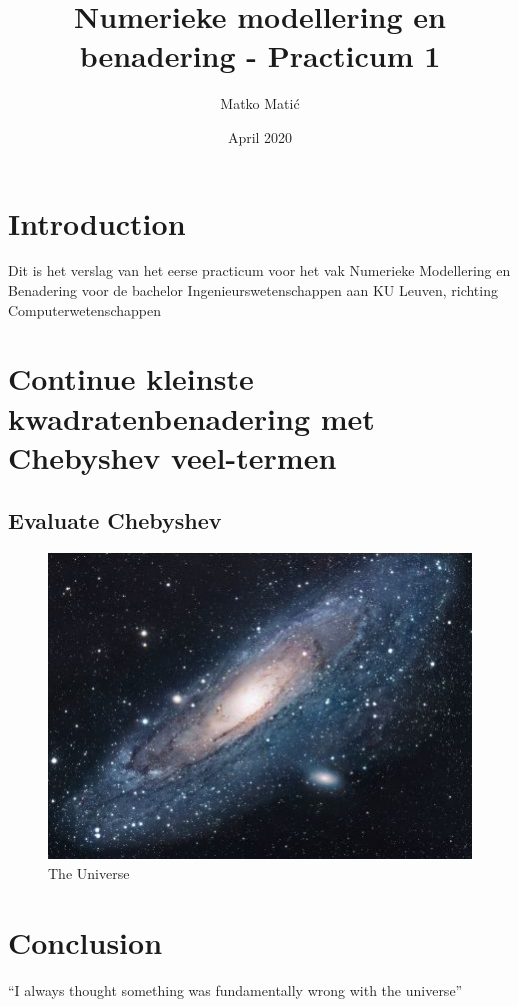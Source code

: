 \documentclass{article}
\title{Numerieke modellering en benadering - Practicum 1}
\author{Matko Matić }
\date{April 2020}
\begin{document}
\maketitle

\section{Introduction}
Dit is het verslag van het eerse practicum voor het vak Numerieke Modellering en Benadering voor de bachelor Ingenieurswetenschappen aan KU Leuven, richting Computerwetenschappen 


\section{Continue kleinste kwadratenbenadering met Chebyshev veel-termen}

\subsection{Evaluate Chebyshev}




\begin{figure}[h!]
\centering
\includegraphics[scale=1.7]{universe}
\caption{The Universe}
\label{fig:universe}
\end{figure}

\section{Conclusion}
``I always thought something was fundamentally wrong with the universe'' \citep{adams1995hitchhiker}



\end{document}

